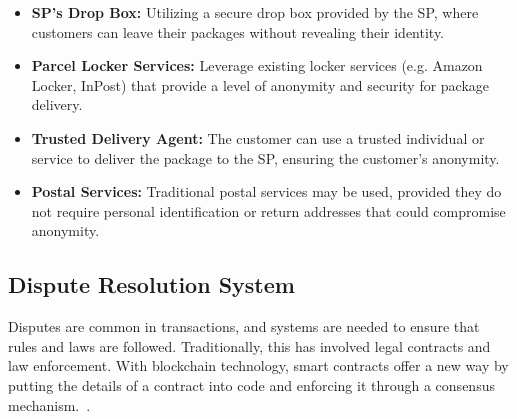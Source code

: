\documentclass[pdftex,twocolumn,epjc3]{svjour3}
\begin{document}
\begin{itemize}
    \item \textbf{SP's Drop Box:} Utilizing a secure drop box provided by the SP, where customers can leave their packages without revealing their identity.

    \item \textbf{Parcel Locker Services:} Leverage existing locker services (e.g. Amazon Locker, InPost) that provide a level of anonymity and security for package delivery.

    \item \textbf{Trusted Delivery Agent:} The customer can use a trusted individual or service to deliver the package to the SP, ensuring the customer's anonymity.

    \item \textbf{Postal Services:} Traditional postal services may be used, provided they do not require personal identification or return addresses that could compromise anonymity.
\end{itemize}



\subsection{Dispute Resolution System}
\label{sec:dispute-resolution}
\begin{sloppypar}
Disputes are common in transactions, and systems are needed to ensure that rules and laws are followed. Traditionally, this has involved legal contracts and law enforcement. With blockchain technology, smart contracts offer a new way by putting the details of a contract into code and enforcing it through a consensus mechanism.~\cite{allenGovernanceBlockchainDispute2019,lingwallShouldCodeBe2019}.
\end{sloppypar}
\end{document}
